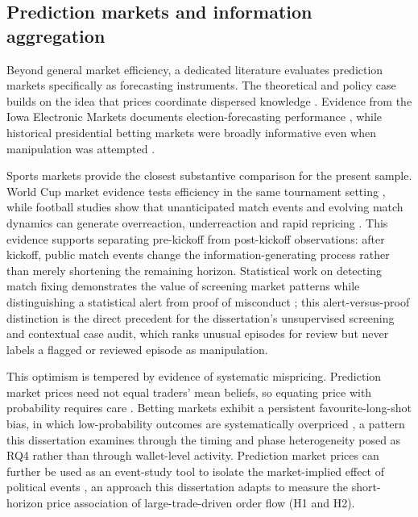 \subsection{Prediction markets and information aggregation}
\label{lr:prediction-markets}

Beyond general market efficiency, a dedicated literature evaluates prediction markets specifically as forecasting instruments. The theoretical and policy case builds on the idea that prices coordinate dispersed knowledge \citep{hayek1945knowledge,wolferszitzewitz2004prediction,arrow2008promise}. Evidence from the Iowa Electronic Markets documents election-forecasting performance \citep{forsythe1992anatomy,berg2008dozen}, while historical presidential betting markets were broadly informative even when manipulation was attempted \citep{rhodestrumpf2004historical}.

Sports markets provide the closest substantive comparison for the present sample. World Cup market evidence tests efficiency in the same tournament setting \citep{gil2007worldcup}, while football studies show that unanticipated match events and evolving match dynamics can generate overreaction, underreaction and rapid repricing \citep{choihui2014surprise,angelini2022inplay,michels2023matchdynamics}. This evidence supports separating pre-kickoff from post-kickoff observations: after kickoff, public match events change the information-generating process rather than merely shortening the remaining horizon. Statistical work on detecting match fixing demonstrates the value of screening market patterns while distinguishing a statistical alert from proof of misconduct \citep{forrestmchale2019matchfixing}; this alert-versus-proof distinction is the direct precedent for the dissertation's unsupervised screening and contextual case audit, which ranks unusual episodes for review but never labels a flagged or reviewed episode as manipulation.

This optimism is tempered by evidence of systematic mispricing. Prediction market prices need not equal traders' mean beliefs, so equating price with probability requires care \citep{manski2006interpreting}. Betting markets exhibit a persistent favourite-long-shot bias, in which low-probability outcomes are systematically overpriced \citep{snowbergwolfers2010favourite,thalerziemba1988betting}, a pattern this dissertation examines through the timing and phase heterogeneity posed as RQ4 rather than through wallet-level activity. Prediction market prices can further be used as an event-study tool to isolate the market-implied effect of political events \citep{snowberg2007partisan}, an approach this dissertation adapts to measure the short-horizon price association of large-trade-driven order flow (H1 and H2).

